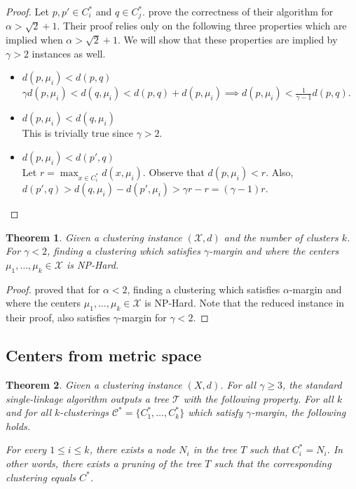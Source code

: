\documentclass{article}
\newcommand{\mc}{\mathcal}
\newtheorem{theorem}{Theorem}
\begin{document}
\begin{proof}
Let $p, p' \in C_i^*$ and $q \in C_j^*$. \cite{balcan2012clustering} prove the correctness of their algorithm for $\alpha > \sqrt{2} + 1$. Their proof relies only on the following three properties which are implied when $\alpha > \sqrt{2} + 1$. We will show that these properties are implied by $\gamma > 2$ instances as well.
\begin{itemize}[nolistsep,noitemsep]
\item $d(p, \mu_i) < d(p, q)$\\
$\gamma d(p, \mu_i) < d(q, \mu_i) < d(p, q) + d(p, \mu_i) \implies d(p, \mu_i) < \frac{1}{\gamma-1}d(p, q)$.
\item $d(p, \mu_i) < d(q, \mu_i)$\\
This is trivially true since $\gamma > 2$.
\item $d(p, \mu_i) < d(p', q)$\\
Let $r = \max_{x \in C_i^*} d(x, \mu_i)$. Observe that $d(p, \mu_i) < r$. Also, $d(p', q)> d(q, \mu_i)-d(p', \mu_i) > \gamma r - r = (\gamma -1)r$.
\end{itemize}
\end{proof}

\begin{theorem}
\label{thm:lowerCenterData}
Given a clustering instance $(\mc X, d)$ and the number of clusters $k$. For $\gamma < 2$, finding a clustering which satisfies $\gamma$-margin and where the centers $\mu_1, \ldots, \mu_k \in \mc X$ is NP-Hard.
\end{theorem}
\begin{proof}
\cite{ben2014data} proved that for $\alpha < 2$, finding a clustering which satisfies $\alpha$-margin and where the centers $\mu_1, \ldots, \mu_k \in \mc X$ is NP-Hard. Note that the reduced instance in their proof, also satisfies $\gamma$-margin for $\gamma < 2$. 
\end{proof}

\subsection{Centers from metric space}
\begin{theorem}
\label{thm:upperCenterMetric}
Given a clustering instance $(X , d)$. For all $\gamma \ge 3$, the standard single-linkage algorithm outputs a tree $\mc T$ with the following property. For all $k$ and for all $k$-clusterings $\mc C^* = \{C_1^*, \ldots, C_k^* \}$ which satisfy $\gamma$-margin, the following holds.

For every $1 \le i \le k$, there exists a node $N_i$ in the tree $T$ such that $C_i^* = N_i$. In other words, there exists a pruning of the tree $T$ such that the corresponding clustering equals $C^*$. 
\end{theorem}
\end{document}
